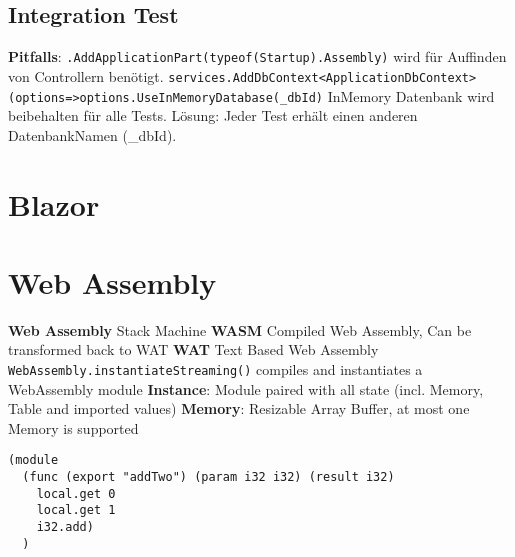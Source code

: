 \begin{multicols*}{2}
\subsection{Integration Test}
\textbf{Pitfalls}: \lstinline|.AddApplicationPart(typeof(Startup).Assembly)| wird für Auffinden von Controllern benötigt.
\lstinline|services.AddDbContext<ApplicationDbContext>(options=>options.UseInMemoryDatabase(_dbId)|
InMemory Datenbank wird beibehalten für alle Tests. Lösung: Jeder Test erhält einen anderen DatenbankNamen (\_dbId).

\section{Blazor}

\section{Web Assembly}
\textbf{Web Assembly} Stack Machine
\textbf{WASM} Compiled Web Assembly, Can be transformed back to WAT
\textbf{WAT} Text Based Web Assembly \lstinline|WebAssembly.instantiateStreaming()| compiles and instantiates a WebAssembly module
\textbf{Instance}: Module paired with all state (incl. Memory, Table and imported values)
\textbf{Memory}: Resizable Array Buffer, at most one Memory is supported
\begin{verbatim}
(module
  (func (export "addTwo") (param i32 i32) (result i32)
    local.get 0
    local.get 1
    i32.add)
  )
\end{verbatim}


\end{multicols*}
